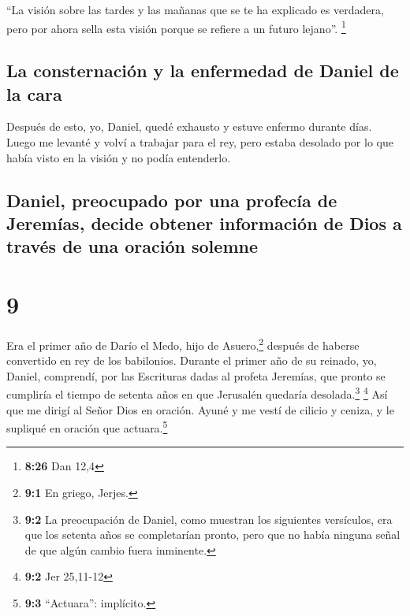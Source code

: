  ``La visión sobre las tardes y las mañanas que se te ha
explicado es verdadera, pero por ahora sella esta visión porque se
refiere a un futuro lejano''. \footnote{\textbf{8:26} Dan 12,4}

\hypertarget{la-consternaciuxf3n-y-la-enfermedad-de-daniel-de-la-cara}{%
\subsection{La consternación y la enfermedad de Daniel de la
cara}\label{la-consternaciuxf3n-y-la-enfermedad-de-daniel-de-la-cara}}

 Después de esto, yo, Daniel, quedé exhausto y estuve
enfermo durante días. Luego me levanté y volví a trabajar para el rey,
pero estaba desolado por lo que había visto en la visión y no podía
entenderlo.

\hypertarget{daniel-preocupado-por-una-profecuxeda-de-jeremuxedas-decide-obtener-informaciuxf3n-de-dios-a-travuxe9s-de-una-oraciuxf3n-solemne}{%
\subsection{Daniel, preocupado por una profecía de Jeremías, decide
obtener información de Dios a través de una oración
solemne}\label{daniel-preocupado-por-una-profecuxeda-de-jeremuxedas-decide-obtener-informaciuxf3n-de-dios-a-travuxe9s-de-una-oraciuxf3n-solemne}}

\hypertarget{section-8}{%
\section{9}\label{section-8}}

 Era el primer año de Darío el Medo, hijo de
Asuero,\footnote{\textbf{9:1} En griego, Jerjes.} después de haberse
convertido en rey de los babilonios.  Durante el primer
año de su reinado, yo, Daniel, comprendí, por las Escrituras dadas al
profeta Jeremías, que pronto se cumpliría el tiempo de setenta años en
que Jerusalén quedaría desolada.\footnote{\textbf{9:2} La preocupación
  de Daniel, como muestran los siguientes versículos, era que los
  setenta años se completarían pronto, pero que no había ninguna señal
  de que algún cambio fuera inminente.} \footnote{\textbf{9:2} Jer
  25,11-12}  Así que me dirigí al Señor Dios en oración.
Ayuné y me vestí de cilicio y ceniza, y le supliqué en oración que
actuara.\footnote{\textbf{9:3} ``Actuara'': implícito.}

